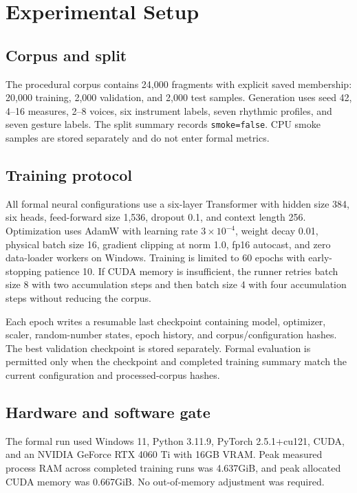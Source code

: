 \section{Experimental Setup}
\label{sec:experiments}

\subsection{Corpus and split}

The procedural corpus contains 24,000 fragments with explicit saved membership: 20,000 training, 2,000 validation, and 2,000 test samples. Generation uses seed 42, 4--16 measures, 2--8 voices, six instrument labels, seven rhythmic profiles, and seven gesture labels. The split summary records \texttt{smoke=false}. CPU smoke samples are stored separately and do not enter formal metrics.

\subsection{Training protocol}

All formal neural configurations use a six-layer Transformer with hidden size 384, six heads, feed-forward size 1,536, dropout 0.1, and context length 256. Optimization uses AdamW with learning rate $3\times10^{-4}$, weight decay 0.01, physical batch size 16, gradient clipping at norm 1.0, fp16 autocast, and zero data-loader workers on Windows. Training is limited to 60 epochs with early-stopping patience 10. If CUDA memory is insufficient, the runner retries batch size 8 with two accumulation steps and then batch size 4 with four accumulation steps without reducing the corpus.

Each epoch writes a resumable last checkpoint containing model, optimizer, scaler, random-number states, epoch history, and corpus/configuration hashes. The best validation checkpoint is stored separately. Formal evaluation is permitted only when the checkpoint and completed training summary match the current configuration and processed-corpus hashes.

\subsection{Hardware and software gate}

The formal run used Windows 11, Python 3.11.9, PyTorch 2.5.1+cu121, CUDA, and an NVIDIA GeForce RTX 4060 Ti with 16GB VRAM. Peak measured process RAM across completed training runs was 4.637GiB, and peak allocated CUDA memory was 0.667GiB. No out-of-memory adjustment was required.

